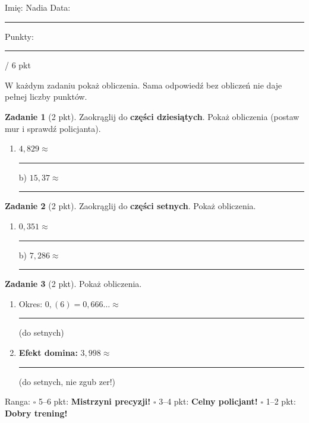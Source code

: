 \documentclass[11pt,a4paper]{article}
\begin{document}

\vspace{0.2em}
Imię: Nadia \hfill Data: \rule{3cm}{0.4pt} \hfill Punkty: \rule{1.2cm}{0.4pt} / 6 pkt

{\small W każdym zadaniu pokaż obliczenia. Sama odpowiedź bez obliczeń nie daje pełnej liczby punktów.}

\vspace{0.4em}

\textbf{Zadanie 1} (2 pkt). Zaokrąglij do \textbf{części dziesiątych}. Pokaż obliczenia (postaw mur i sprawdź policjanta).
\begin{enumerate}[label=\alph*), leftmargin=*, itemsep=4pt]
  \item $4{,}829\approx$ \rule{2.5cm}{0.4pt} \hspace{1cm} b) $15{,}37\approx$ \rule{2.5cm}{0.4pt}
\end{enumerate}
\miejsce{3.8cm}

\textbf{Zadanie 2} (2 pkt). Zaokrąglij do \textbf{części setnych}. Pokaż obliczenia.
\begin{enumerate}[label=\alph*), leftmargin=*, itemsep=4pt]
  \item $0{,}351\approx$ \rule{2.5cm}{0.4pt} \hspace{1cm} b) $7{,}286\approx$ \rule{2.5cm}{0.4pt}
\end{enumerate}
\miejsce{4.4cm}

\textbf{Zadanie 3} (2 pkt). Pokaż obliczenia.
\begin{enumerate}[label=\alph*), leftmargin=*, itemsep=4pt]
  \item Okres: $0{,}(6)=0{,}666\ldots\approx$ \rule{2.5cm}{0.4pt} (do setnych)
  \item \textbf{Efekt domina:} $3{,}998\approx$ \rule{2.5cm}{0.4pt} (do setnych, nie zgub zer!)
\end{enumerate}
\miejsce{4.4cm}

\vfill
\begin{tcolorbox}[colback=white, colframe=cel, boxrule=0.6pt, arc=2pt]
Ranga: \quad $\square$ 5--6 pkt: \textbf{Mistrzyni precyzji!} \quad $\square$ 3--4 pkt: \textbf{Celny policjant!} \quad $\square$ 1--2 pkt: \textbf{Dobry trening!}
\end{tcolorbox}
\end{document}
